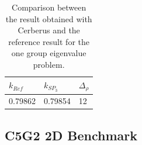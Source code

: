 \documentclass{anstrans}
\begin{document}


\begin{table}[htbp!]
	\centering
	\caption{Comparison between the result obtained with Cerberus and the reference result for the one group eigenvalue problem.}
	\label{tab:keff-1st}
	\begin{tabular}{lll}
	\toprule
		$k_{Ref}$	& $k_{SP_3}$ 	& $\Delta_{\rho}$	\\
	\midrule
	 	0.79862		& 0.79854		& 12				\\
	\bottomrule
	\end{tabular}
\end{table}


\subsection{C5G2 2D Benchmark}
\end{document}
